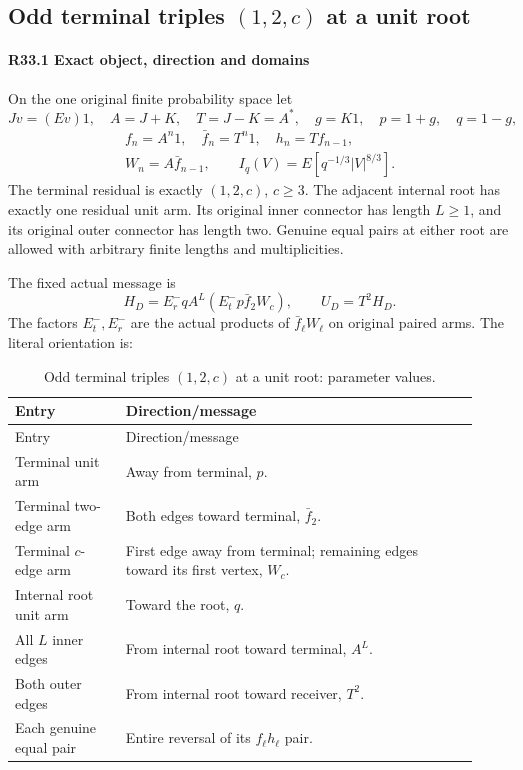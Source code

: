 \subsection{Odd terminal triples $(1,2,c)$ at a unit root}\label{proof:R2-C033}

\paragraph{R33.1 Exact object, direction and domains}

On the one original finite probability space let
\[
Jv=(Ev)1,\quad A=J+K,\quad T=J-K=A^*,\quad
g=K1,\quad p=1+g,\quad q=1-g,
\]
\[
\begin{gathered}
f_n=A^n1,\quad \bar f_n=T^n1,\quad h_n=Tf_{n-1},\quad\\
W_n=A\bar f_{n-1},\qquad I_q(V)=E[q^{-1/3}|V|^{8/3}].
\end{gathered}
\]
The terminal residual is exactly \((1,\allowbreak \allowbreak  2,\allowbreak \allowbreak  c)\), \(c\ge3\). The adjacent
internal root has exactly one residual unit arm. Its original inner
connector has length \(L\ge1\), and its original outer connector has
length two. Genuine equal pairs at either root are allowed with arbitrary
finite lengths and multiplicities.

The fixed actual message is
\[
H_D=E_r^-qA^L(E_t^-p\bar f_2W_c),\qquad U_D=T^2H_D.       \tag{R33.A1}
\]
The factors \(E_t^-,\allowbreak \allowbreak  E_r^-\) are the actual products of \(\bar f_\ell W_\ell\)
on original paired arms. The literal orientation is:


\begingroup\small
\setlength{\tabcolsep}{3pt}
\setlength{\LTleft}{0pt}\setlength{\LTright}{\fill}
\begin{longtable}{@{}p{0.2200\linewidth}p{0.7000\linewidth}@{}}
\caption{Odd terminal triples $(1,2,c)$ at a unit root: parameter values.}\label{tab:parameters:r2-c033:1}\\
\toprule
Entry & Direction/message \\
\midrule\endfirsthead
\toprule
Entry & Direction/message \\
\midrule\endhead
\bottomrule\endfoot
Terminal unit arm & Away from terminal, \(p\). \\
\addlinespace[2pt]
Terminal two-edge arm & Both edges toward terminal, \(\bar f_2\). \\
\addlinespace[2pt]
Terminal \(c\)-edge arm & First edge away from terminal; remaining edges toward its first vertex, \(W_c\). \\
\addlinespace[2pt]
Internal root unit arm & Toward the root, \(q\). \\
\addlinespace[2pt]
All \(L\) inner edges & From internal root toward terminal, \(A^L\). \\
\addlinespace[2pt]
Both outer edges & From internal root toward receiver, \(T^2\). \\
\addlinespace[2pt]
Each genuine equal pair & Entire reversal of its \(f_\ell h_\ell\) pair. \\
\end{longtable}
\endgroup



